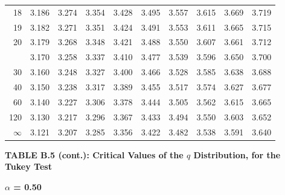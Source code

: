 \documentclass[10pt]{article}
\begin{document}
\begin{longtable}{@{}r!{\vrule width 0.8pt\hspace{0.55em}}rrrrrrrrr@{}}
18 & 3.186 & 3.274 & 3.354 & 3.428 & 3.495 & 3.557 & 3.615 & 3.669 & 3.719 \\
19 & 3.182 & 3.271 & 3.351 & 3.424 & 3.491 & 3.553 & 3.611 & 3.665 & 3.715 \\
20 & 3.179 & 3.268 & 3.348 & 3.421 & 3.488 & 3.550 & 3.607 & 3.661 & 3.712 \\
 & 3.170 & 3.258 & 3.337 & 3.410 & 3.477 & 3.539 & 3.596 & 3.650 & 3.700 \\
30 & 3.160 & 3.248 & 3.327 & 3.400 & 3.466 & 3.528 & 3.585 & 3.638 & 3.688 \\
40 & 3.150 & 3.238 & 3.317 & 3.389 & 3.455 & 3.517 & 3.574 & 3.627 & 3.677 \\
60 & 3.140 & 3.227 & 3.306 & 3.378 & 3.444 & 3.505 & 3.562 & 3.615 & 3.665 \\
120 & 3.130 & 3.217 & 3.296 & 3.367 & 3.433 & 3.494 & 3.550 & 3.603 & 3.652 \\
\addlinespace[0.30em]
$\infty$ & 3.121 & 3.207 & 3.285 & 3.356 & 3.422 & 3.482 & 3.538 & 3.591 & 3.640 \\
\end{longtable}
\newpage
\thispagestyle{empty}
\begin{center}
{\large\bfseries TABLE B.5 (cont.): Critical Values of the $q$ Distribution, for the Tukey Test\par}
\end{center}
{\large\bfseries $\alpha$ = 0.50\par}
\vspace{0.45em}
\small
\end{document}
